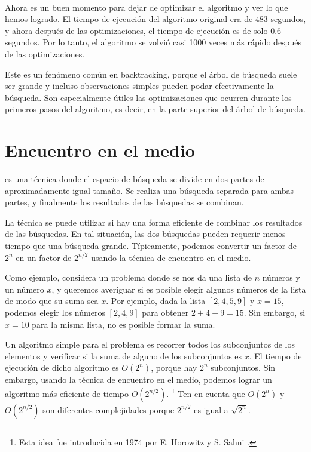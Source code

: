 ~\\
Ahora es un buen momento para dejar de optimizar
el algoritmo y ver lo que hemos logrado.
El tiempo de ejecución del algoritmo original
era de 483 segundos,
y ahora después de las optimizaciones,
el tiempo de ejecución es de solo 0.6 segundos.
Por lo tanto, el algoritmo se volvió casi 1000 veces
más rápido después de las optimizaciones.

Este es un fenómeno común en backtracking,
porque el árbol de búsqueda suele ser grande
y incluso observaciones simples pueden podar efectivamente
la búsqueda.
Son especialmente útiles las optimizaciones que
ocurren durante los primeros pasos del algoritmo,
es decir, en la parte superior del árbol de búsqueda.

\section{Encuentro en el medio}


 es una técnica
donde el espacio de búsqueda se divide en
dos partes de aproximadamente igual tamaño.
Se realiza una búsqueda separada
para ambas partes,
y finalmente los resultados de las búsquedas se combinan.

La técnica se puede utilizar
si hay una forma eficiente de combinar los
resultados de las búsquedas.
En tal situación, las dos búsquedas pueden requerir menos
tiempo que una búsqueda grande.
Típicamente, podemos convertir un factor de $2^n$
en un factor de $2^{n/2}$ usando la técnica de encuentro en el
medio.

Como ejemplo, considera un problema donde
se nos da una lista de $n$ números y
un número $x$,
y queremos averiguar si es posible
elegir algunos números de la lista de modo que
su suma sea $x$.
Por ejemplo, dada la lista $[2,4,5,9]$ y $x=15$,
podemos elegir los números $[2,4,9]$ para obtener $2+4+9=15$.
Sin embargo, si $x=10$ para la misma lista,
no es posible formar la suma.

Un algoritmo simple para el problema es recorrer
todos los subconjuntos de los elementos y
verificar si la suma de alguno de los subconjuntos es $x$.
El tiempo de ejecución de dicho algoritmo es $O(2^n)$,
porque hay $2^n$ subconjuntos.
Sin embargo, usando la técnica de encuentro en el medio,
podemos lograr un algoritmo más eficiente de tiempo $O(2^{n/2})$.
\footnote{Esta idea fue introducida en 1974 por E. Horowitz y
  S. Sahni \cite{hor74}.}
Ten en cuenta que $O(2^n)$ y $O(2^{n/2})$ son diferentes
complejidades porque $2^{n/2}$ es igual a $\sqrt{2^n}$.

